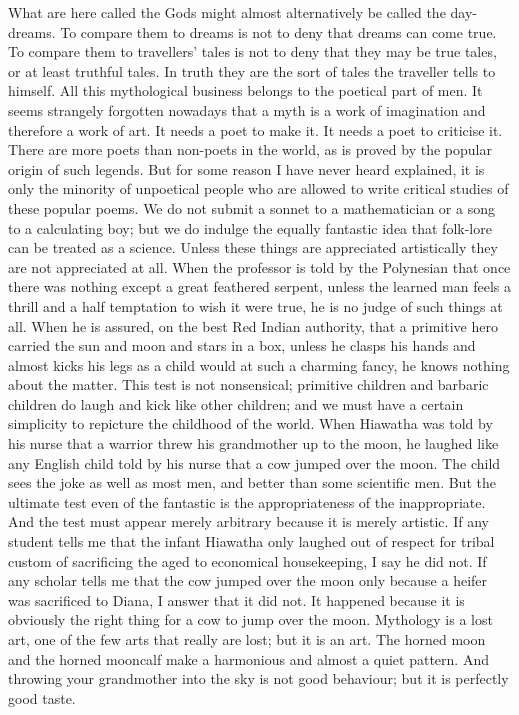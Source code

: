 What are here called the Gods might almost alternatively be called the day-dreams. To compare them to dreams is not to deny that dreams can come true. To compare them to travellers' tales is not to deny that they may be true tales, or at least truthful tales. In truth they are the sort of tales the traveller tells to himself. All this mythological business belongs to the poetical part of men. It seems strangely forgotten nowadays that a myth is a work of imagination and therefore a work of art. It needs a poet to make it. It needs a poet to criticise it. There are more poets than non-poets in the world, as is proved by the popular origin of such legends. But for some reason I have never heard explained, it is only the minority of unpoetical people who are allowed to write critical studies of these popular poems. We do not submit a sonnet to a mathematician or a song to a calculating boy; but we do indulge the equally fantastic idea that folk-lore can be treated as a science. Unless these things are appreciated artistically they are not appreciated at all. When the professor is told by the Polynesian that once there was nothing except a great feathered serpent, unless the learned man feels a thrill and a half temptation to wish it were true, he is no judge of such things at all. When he is assured, on the best Red Indian authority, that a primitive hero carried the sun and moon and stars in a box, unless he clasps his hands and almost kicks his legs as a child would at such a charming fancy, he knows nothing about the matter. This test is not nonsensical; primitive children and barbaric children do laugh and kick like other children; and we must have a certain simplicity to repicture the childhood of the world. When Hiawatha was told by his nurse that a warrior threw his grandmother up to the moon, he laughed like any English child told by his nurse that a cow jumped over the moon. The child sees the joke as well as most men, and better than some scientific men. But the ultimate test even of the fantastic is the appropriateness of the inappropriate. And the test must appear merely arbitrary because it is merely artistic. If any student tells me that the infant Hiawatha only laughed out of respect for tribal custom of sacrificing the aged to economical housekeeping, I say he did not. If any scholar tells me that the cow jumped over the moon only because a heifer was sacrificed to Diana, I answer that it did not. It happened because it is obviously the right thing for a cow to jump over the moon. Mythology is a lost art, one of the few arts that really are lost; but it is an art. The horned moon and the horned mooncalf make a harmonious and almost a quiet pattern. And throwing your grandmother into the sky is not good behaviour; but it is perfectly good taste.

